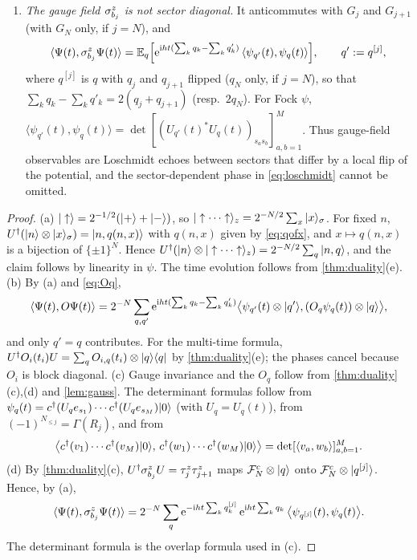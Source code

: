 \begin{corollary}
\begin{enumerate}[label=(\alph*)]
\begin{equation}\label{eq:stringdet}
  \langle\psi_q(t),(-1)^{N_{\le j}}\psi_q(t)\rangle=\det\bigl[(U_q(t)^*R_jU_q(t))_{s_as_b}\bigr]_{a,b=1}^M,
  \qquad R_j:=\diag\bigl((-1)^{\one[x\le j]}\bigr)_{x=1}^N .
\end{equation}
\item \emph{The gauge field $\sigma^{z}_{b_{j}}$ is not sector diagonal.}  It anticommutes with $G_j$ and
$G_{j+1}$ (with $G_N$ only, if $j=N$), and
\begin{equation}\label{eq:loschmidt}
  \langle\Psi(t),\sigma^{z}_{b_{j}}\Psi(t)\rangle=\mathbb{E}_q\Bigl[\mathrm{e}^{\mathrm{i} ht(\sum_kq_k-\sum_kq'_k)}\,
  \langle\psi_{q'}(t),\psi_q(t)\rangle\Bigr],\qquad q':=q^{[j]},
\end{equation}
where $q^{[j]}$ is $q$ with $q_j$ and $q_{j+1}$ flipped ($q_N$ only, if $j=N$), so that
$\sum_kq_k-\sum_kq'_k=2(q_j+q_{j+1})$ (resp.\ $2q_N$).  For Fock $\psi$,
$\langle\psi_{q'}(t),\psi_q(t)\rangle=\det[(U_{q'}(t)^*U_q(t))_{s_as_b}]_{a,b=1}^M$.  Thus gauge-field
observables are Loschmidt echoes between sectors that differ by a local flip of the potential, and
the sector-dependent phase in \eqref{eq:loschmidt} cannot be omitted.
\end{enumerate}
\end{corollary}

\begin{proof}
(a) $|\uparrow\rangle=2^{-1/2}(|+\rangle+|-\rangle)$, so $|\uparrow\cdots\uparrow\rangle_z=2^{-N/2}\sum_x|x\rangle_\sigma$.
For fixed $n$, $U^\dagger(|n\rangle\otimes|x\rangle_\sigma)=|n,q(n,x)\rangle$ with $q(n,x)$ given by
\eqref{eq:qofx}, and $x\mapsto q(n,x)$ is a bijection of $\{\pm1\}^N$.  Hence
$U^\dagger(|n\rangle\otimes|\uparrow\cdots\uparrow\rangle_z)=2^{-N/2}\sum_q|n,q\rangle$, and the claim
follows by linearity in $\psi$.  The time evolution follows from \cref{thm:duality}(e).
(b) By (a) and \eqref{eq:Oq},
\[
  \langle\Psi(t),O\Psi(t)\rangle=2^{-N}\sum_{q,q'}\mathrm{e}^{\mathrm{i} ht(\sum_kq_k-\sum_kq'_k)}
  \bigl\langle\psi_{q'}(t)\otimes|q'\rangle,(O_q\psi_q(t))\otimes|q\rangle\bigr\rangle,
\]
and only $q'=q$ contributes.  For the multi-time formula,
$U^\dagger O_i(t_i)U=\sum_qO_{i,q}(t_i)\otimes|q\rangle\langle q|$ by \cref{thm:duality}(e); the phases cancel
because $O_i$ is block diagonal.
(c) Gauge invariance and the $O_q$ follow from \cref{thm:duality}(c),(d) and \cref{lem:gauss}.  The
determinant formulas follow from $\psi_q(t)=c^\dagger(U_qe_{s_1})\cdots c^\dagger(U_qe_{s_M})|0\rangle$
(with $U_q=U_q(t)$), from $(-1)^{N_{\le j}}=\Gamma(R_j)$, and from
\[
  \bigl\langle c^\dagger(v_1)\cdots c^\dagger(v_M)|0\rangle,\,c^\dagger(w_1)\cdots c^\dagger(w_M)|0\rangle\bigr\rangle
  =\det[\langle v_a,w_b\rangle]_{a,b=1}^M .
\]
(d) By \cref{thm:duality}(c), $U^\dagger\sigma^{z}_{b_{j}}U=\tau^{z}_{j}\tau^{z}_{j+1}$ maps $\mathcal{F}^c_N\otimes|q\rangle$ onto
$\mathcal{F}^c_N\otimes|q^{[j]}\rangle$.  Hence, by (a),
\[
  \langle\Psi(t),\sigma^{z}_{b_{j}}\Psi(t)\rangle
  =2^{-N}\sum_q\mathrm{e}^{-\mathrm{i} ht\sum_kq^{[j]}_k}\,\mathrm{e}^{\mathrm{i} ht\sum_kq_k}\,
  \bigl\langle\psi_{q^{[j]}}(t),\psi_q(t)\bigr\rangle .
\]
The determinant formula is the overlap formula used in (c).
\end{proof}

